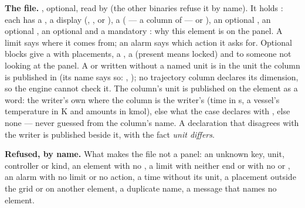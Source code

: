 \documentclass[11pt,a4paper]{article}
\begin{document}
\textbf{The file.} , optional, read by
 (the other binaries refuse it by name). It holds
: each has a , a display 
(, ,  or ), a
 ( --- a column of
 --- or ), an optional
, an optional , an optional  and a
mandatory : why this element is on the panel. A limit says
where it comes from; an alarm says which action it asks for. Optional
blocks give a  with placements, a , a
 (present means locked) and
 to someone not looking at the panel. A  or
 written without a named unit is in the unit the column is
published in (its name says so: , ); no
trajectory column declares its dimension, so the engine cannot check it.
The column's unit is published on the element as a word: the writer's own
where the column is the writer's (time in s, a vessel's temperature in K and
amounts in kmol), else what the case declares with
, else none --- never guessed from
the column's name. A declaration that disagrees with the writer is published
beside it, with the fact \emph{unit differs}.

\textbf{Refused, by name.} What makes the file not a panel: an unknown key,
unit, controller or kind, an element with no , a limit with
neither end or with no  or , an alarm with no limit
or no action, a time without its unit, a placement outside the grid or on
another element, a duplicate name, a message that names no element.
\end{document}
